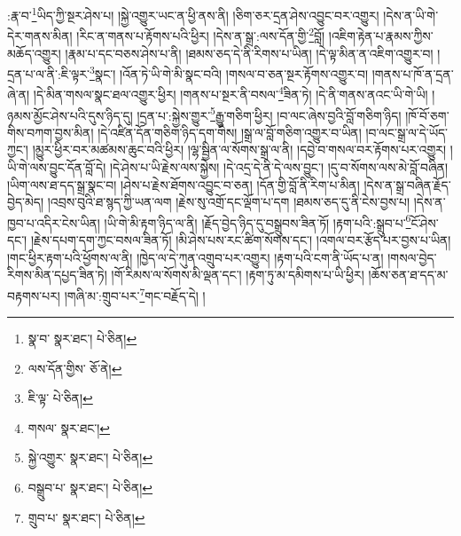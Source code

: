 :རྣ་བ་\footnote{སྣ་བ་  སྣར་ཐང་།  པེ་ཅིན། }ཡིད་ཀྱི་སྔར་ཤེས་པ། །སྐྱེ་འགྱུར་ཡང་ན་ཕྱི་ནས་ནི། །ཅིག་ཅར་དྲན་ཤེས་འབྱུང་བར་འགྱུར། །དེས་ན་ཡི་གེ་དེར་གནས་མིན། །རིང་ན་གནས་པ་རྟོགས་པའི་ཕྱིར། །དེས་ན་སྒྲ་:ལས་དོན་གྱི་\footnote{ལས་དོན་གྱིས་  ཅོ་ནེ། }བློ། །འཇིག་རྟེན་པ་རྣམས་ཀྱིས་མཆོད་འགྱུར། །རྣམ་པ་དང་བཅས་ཤེས་པ་ནི། །ཐམས་ཅད་དེ་ནི་རིགས་པ་ཡིན། །དེ་ལྟ་མིན་ན་འཇིག་འགྱུར་བ། །དྲན་པ་ལ་ནི་:ཇི་ལྟར་\footnote{ཇི་ལྟ་  པེ་ཅིན། }སྣང་། །འོན་ཏེ་ཡི་གེ་མི་སྣང་བའི། །གསལ་བ་ཅན་སྔར་རྟོགས་འགྱུར་བ། །གནས་པ་ཁོ་ན་དྲན་ཞེ་ན། །དེ་མིན་གསལ་སྣང་ཐལ་འགྱུར་ཕྱིར། །གནས་པ་སྔར་ནི་བསལ་\footnote{གསལ་  སྣར་ཐང་། }ཟིན་ཏེ། །དེ་ནི་གནས་ནའང་ཡི་གེ་ཡི། །ཉམས་མྱོང་ཤེས་པའི་དུས་ཉིད་དུ། །དྲན་པ་:སྐྱེས་གྱུར་\footnote{སྐྱེ་འགྱུར་  སྣར་ཐང་།  པེ་ཅིན། }རྒྱུ་གཅིག་ཕྱིར། །བ་ལང་ཞེས་བྱའི་བློ་གཅིག་ཉིད། །ཁོ་བོ་ཅག་གིས་བཀག་བྱས་མིན། །དེ་འཛིན་དོན་གཅིག་ཉིད་དག་གིས། །སྒྲ་ལ་བློ་གཅིག་འགྱུར་བ་ཡིན། །བ་ལང་སྒྲ་ལ་དེ་ཡོད་ཀྱང་། །མྱུར་ཕྱིར་བར་མཚམས་ཆུང་བའི་ཕྱིར། །ལྷ་སྦྱིན་ལ་སོགས་སྒྲ་ལ་ནི། །དབྱེ་བ་གསལ་བར་རྟོགས་པར་འགྱུར། །ཡི་གེ་ལས་བྱུང་དོན་བློ་དེ། །དེ་ཤེས་པ་ཡི་རྗེས་ལས་སྐྱེས། །དེ་འདྲ་དེ་ནི་དེ་ལས་བྱུང་། །དུ་བ་སོགས་ལས་མེ་བློ་བཞིན། །ཡིག་ལས་ཐ་དད་སྒྲ་སྣང་བ། །ཤེས་པ་རྗེས་ཐོགས་འབྱུང་བ་ཅན། །དོན་གྱི་བློ་ནི་རིག་པ་མིན། །དེས་ན་སྒྲ་བཞིན་རྗོད་བྱེད་མེད། །འབྲས་བུའི་ཐ་སྙད་ཀྱི་ཡན་ལག །རྗེས་སུ་འགྲོ་དང་ལྡོག་པ་དག །ཐམས་ཅད་དུ་ནི་ངེས་བྱས་པ། །དེས་ན་ཁྱབ་པ་འདིར་ངེས་ཡིན། །ཡི་གེ་མི་རྟག་ཉིད་ལ་ནི། །རྗོད་བྱེད་ཉིད་དུ་བསྒྲུབས་ཟིན་ཏོ། །རྟག་པའི་:སྒྲུབ་པ་\footnote{བསྒྲུབ་པ་  སྣར་ཐང་།  པེ་ཅིན། }ངོ་ཤེས་དང་། །རྗེས་དཔག་དག་ཀྱང་བསལ་ཟིན་ཏོ། །མི་ཤེས་པས་རང་ཚིག་སོགས་དང་། །འགལ་བར་རྩོད་པར་བྱས་པ་ཡིན། །གང་ཕྱིར་རྟག་པའི་ཕྱོགས་ལ་ནི། །ཁྱེད་ལ་དེ་ཀུན་འགྲུབ་པར་འགྱུར། །རྟག་པའི་ངག་ནི་ཡོད་པ་ན། །གསལ་བྱེད་རིགས་མིན་དཔྱད་ཟིན་ཏེ། །གོ་རིམས་ལ་སོགས་མི་ལྡན་དང་། །རྟག་ཏུ་མ་དམིགས་པ་ཡི་ཕྱིར། །ཆོས་ཅན་ཐ་དད་མ་བརྟགས་པར། །གཞི་མ་:གྲུབ་པར་\footnote{གྲུབ་པ་  སྣར་ཐང་།  པེ་ཅིན། }གང་བརྗོད་དེ། །
